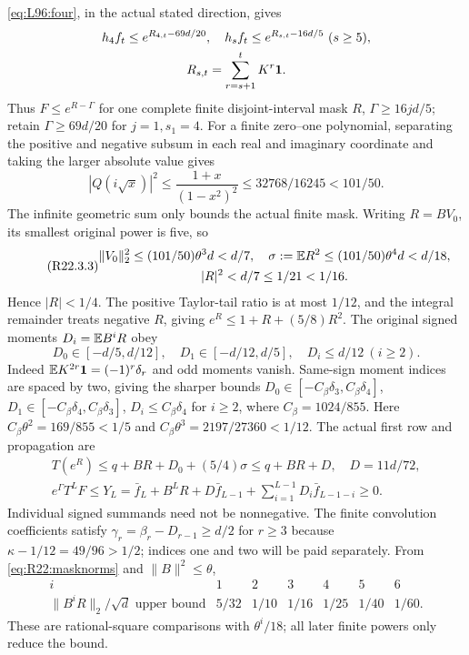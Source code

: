 \eqref{eq:L96:four}, in the actual stated direction, gives
\[
\begin{gathered}
h_4f_t\le e^{R_{4,t}-69d/20},\quad h_sf_t\le e^{R_{s,t}-16d/5}\ (s\ge5),\\
R_{s,t}=\sum_{r=s+1}^tK^r\one.
\end{gathered}
\]
Thus $F\le e^{R-\Gamma}$ for one complete finite disjoint-interval
mask $R$, $\Gamma\ge16jd/5$; retain $\Gamma\ge69d/20$ for
$j=1,s_1=4$.
For a finite zero--one polynomial, separating the positive and negative
subsum in each real and imaginary coordinate and taking the larger
absolute value gives
\[
|Q(i\sqrt x)|^2\le\frac{1+x}{(1-x^2)^2}
\le32768/16245<101/50.
\]
The infinite geometric sum only bounds the actual finite mask.
Writing $R=BV_0$, its smallest original power is five, so
\begin{equation}\tag{R22.3.3}\label{eq:R22:masknorms}
\begin{gathered}
\|V_0\|_2^2\le(101/50)\theta^3d<d/7,\quad \sigma:=\mathbb E R^2\le(101/50)\theta^4d<d/18,\\
|R|^2<d/7\le1/21<1/16.
\end{gathered}
\end{equation}
Hence $|R|<1/4$. The positive Taylor-tail ratio is at most $1/12$,
and the integral remainder treats negative $R$, giving
$e^R\le1+R+(5/8)R^2$.
The original signed moments $D_i=\mathbb E B^iR$ obey
\begin{equation}\tag{R22.3.4}\label{eq:R22:signed}
D_0\in[-d/5,d/12],\quad D_1\in[-d/12,d/5],\quad
D_i\le d/12\ (i\ge2).
\end{equation}
Indeed $\mathbb E K^{2r}\mathbf1=(-1)^r\delta_r$ and odd moments vanish.
Same-sign moment indices are spaced by two, giving the sharper bounds
$D_0\in[-C_\beta\delta_3,C_\beta\delta_4]$,
$D_1\in[-C_\beta\delta_4,C_\beta\delta_3]$,
$D_i\le C_\beta\delta_4$ for $i\ge2$, where $C_\beta=1024/855$.
Here $C_\beta\theta^2=169/855<1/5$ and
$C_\beta\theta^3=2197/27360<1/12$.
The actual first row and propagation are
\begin{equation}\tag{R22.3.6}\label{eq:R22:propagation}
\begin{gathered}
T(e^R)\le q+BR+D_0+(5/4)\sigma\le q+BR+D,
\quad D=11d/72,\\
e^\Gamma T^LF\le Y_L=\bar f_L+B^LR+D\bar f_{L-1}
+\sum_{i=1}^{L-1}D_i\bar f_{L-1-i}\ge0.
\end{gathered}
\end{equation}
Individual signed summands need not be nonnegative.
The finite convolution coefficients satisfy
$\gamma_r=\beta_r-D_{r-1}\ge d/2$ for $r\ge3$ because
$\kappa-1/12=49/96>1/2$; indices one and two will be paid separately.
From \eqref{eq:R22:masknorms} and $\|B\|^2\le\theta$,
\begin{equation}\tag{R22.3.8}\label{eq:R22:tails}
\begin{array}{c|rrrrrr}
i&1&2&3&4&5&6\\\hline
\|B^iR\|_2/\sqrt d\text{ upper bound}
&5/32&1/10&1/16&1/25&1/40&1/60.
\end{array}
\end{equation}
These are rational-square comparisons with $\theta^i/18$; all later
finite powers only reduce the bound.

